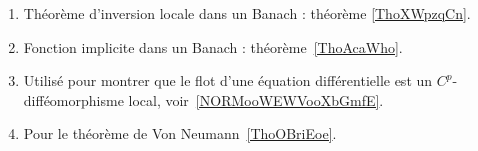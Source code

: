 
	\label{THEMEooInversionLocale}
\begin{enumerate}
	\item
	      Théorème d'inversion locale dans un Banach : théorème \ref{ThoXWpzqCn}.
	\item
	      Fonction implicite dans un Banach : théorème~\ref{ThoAcaWho}.
	\item
	      Utilisé pour montrer que le flot d'une équation différentielle est un \( C^p\)-difféomorphisme local, voir~\ref{NORMooWEWVooXbGmfE}. %
	\item
	      Pour le théorème de Von Neumann~\ref{ThoOBriEoe}.
\end{enumerate}

